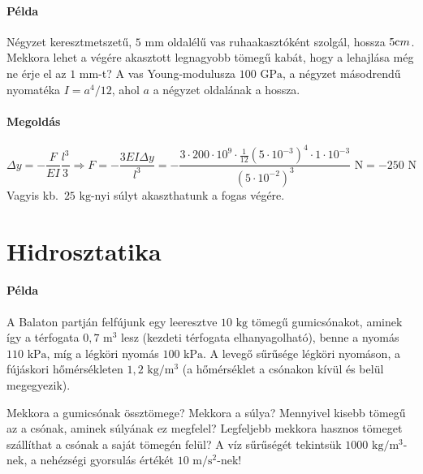 \documentclass[12pt,a4paper]{scrartcl}
\begin{document}
\paragraph{Példa}
Négyzet keresztmetszetű, $5{\text{ mm}}$ oldalélű vas ruhaakasztóként szolgál, hossza $5{\text cm}$. Mekkora lehet a végére akasztott legnagyobb tömegű kabát, hogy a lehajlása még ne érje el az $1{\text{ mm}}$-t? A vas Young-modulusza $100{\text{ GPa}}$, a négyzet másodrendű nyomatéka $I = {a^4}/12$, ahol $a$ a négyzet oldalának a hossza.
\paragraph{Megoldás}
\[\Delta y =  - \frac{F}{{EI}}\frac{{{l^3}}}{3} \Rightarrow F =  - \frac{{3EI\Delta y}}{{{l^3}}} =  - \frac{{3 \cdot 200 \cdot {{10}^9} \cdot \frac{1}{{12}}{{\left( {5 \cdot {{10}^{ - 3}}} \right)}^4} \cdot 1 \cdot {{10}^{ - 3}}}}{{{{\left( {5 \cdot {{10}^{ - 2}}} \right)}^3}}}{\text{ N}} =  - 250{\text{ N}}\]
Vagyis kb.\ $25 {\text{ kg}}$-nyi súlyt akaszthatunk a fogas végére.
\normalsize

\section{Hidrosztatika}
\footnotesize
\paragraph{Példa}
A Balaton partján felfújunk egy leeresztve $10 \text{ kg}$ tömegű gumicsónakot, aminek így a térfogata $0{,}7\text{ m}^3$ lesz (kezdeti térfogata elhanyagolható), benne a nyomás $110\text{ kPa}$, míg a légköri nyomás $100\text{ kPa}$. A levegő sűrűsége légköri nyomáson, a fújáskori hőmérsékleten $1{,}2\text{ kg}/\text{m}^3$ (a hőmérséklet a csónakon kívül és belül megegyezik).

Mekkora a gumicsónak össztömege? Mekkora a súlya? Mennyivel kisebb tömegű az a csónak, aminek súlyának ez megfelel? Legfeljebb mekkora hasznos tömeget szállíthat a csónak a saját tömegén felül? A víz sűrűségét tekintsük $1000\text{ kg}/\text{m}^3$-nek, a nehézségi gyorsulás értékét $10\text{ m}/\text{s}^2$-nek!
\end{document}
